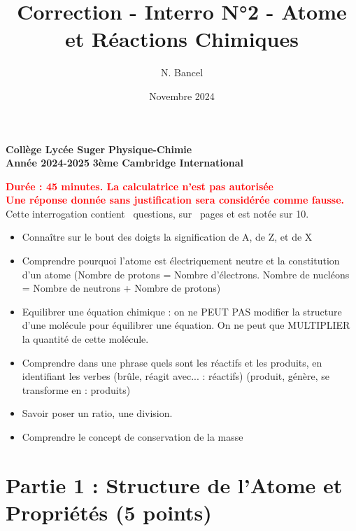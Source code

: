 \documentclass{exam}
\title{Correction - Interro N°2 - Atome et Réactions Chimiques}
\author{N. Bancel}
\date{Novembre 2024}
\begin{document}
\textbf{Collège Lycée Suger}
\hfill
\textbf{Physique-Chimie} \\

\textbf{Année 2024-2025}
\hfill
\textbf{3ème Cambridge International} \par

{\let\newpage\relax\maketitle}

\begin{center}
\textbf{\textcolor{red}{Durée : 45 minutes. La calculatrice n'est pas autorisée}} \\
\textbf{\textcolor{red}{Une réponse donnée sans justification sera considérée comme fausse.}} \\
Cette interrogation contient \numquestions\ questions, sur \numpages\ pages et est notée sur 10. 
\end{center}

\begin{tcolorbox}[colback=green!10!white, colframe=green!75!black, title=A retravailler et à assimiler à tout prix]
  \begin{itemize}[noitemsep]
    \item Connaître sur le bout des doigts la signification de A, de Z, et de X
    \item Comprendre pourquoi l'atome est électriquement neutre et la constitution d'un atome (Nombre de protons = Nombre d'électrons. Nombre de nucléons = Nombre de neutrons + Nombre de protons)
    \item Equilibrer une équation chimique : on ne PEUT PAS modifier la structure d'une molécule pour équilibrer une équation. On ne peut que MULTIPLIER la quantité de cette molécule.
    \item Comprendre dans une phrase quels sont les réactifs et les produits, en identifiant les verbes (brûle, réagit avec... : réactifs) (produit, génère, se transforme en : produits)
    \item Savoir poser un ratio, une division.
    \item Comprendre le concept de conservation de la masse
  \end{itemize}
\end{tcolorbox}

\section*{Partie 1 : Structure de l'Atome et Propriétés (5 points)}
\end{document}
